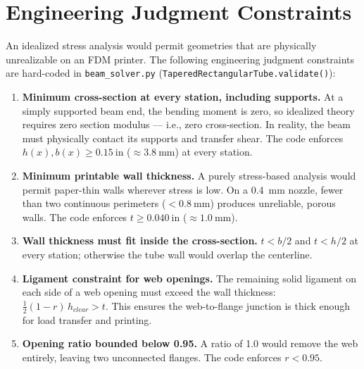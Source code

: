 \documentclass[11pt,letterpaper]{article}
\begin{document}
\section{Engineering Judgment Constraints}
\label{sec:constraints}

An idealized stress analysis would permit geometries that are physically
unrealizable on an FDM printer.  The following engineering judgment constraints
are hard-coded in \texttt{beam\_solver.py} (\texttt{TaperedRectangularTube.validate()}):

\begin{enumerate}
  \item \textbf{Minimum cross-section at every station, including supports.}
    At a simply supported beam end, the bending moment is zero, so idealized
    theory requires zero section modulus --- i.e., zero cross-section.  In
    reality, the beam must physically contact its supports and transfer shear.
    The code enforces $h(x), b(x) \ge 0.15\ \mathrm{in}$ ($\approx 3.8\ \mathrm{mm}$)
    at every station.

  \item \textbf{Minimum printable wall thickness.}
    A purely stress-based analysis would permit paper-thin walls wherever
    stress is low.  On a 0.4~mm nozzle, fewer than two continuous perimeters
    ($< 0.8\ \mathrm{mm}$) produces unreliable, porous walls.  The code
    enforces $t \ge 0.040\ \mathrm{in}$ ($\approx 1.0\ \mathrm{mm}$).

  \item \textbf{Wall thickness must fit inside the cross-section.}
    $t < b/2$ and $t < h/2$ at every station; otherwise the tube wall
    would overlap the centerline.

  \item \textbf{Ligament constraint for web openings.}
    The remaining solid ligament on each side of a web opening must exceed
    the wall thickness: $\tfrac{1}{2}(1 - r)\,h_{clear} > t$.  This ensures
    the web-to-flange junction is thick enough for load transfer and printing.

  \item \textbf{Opening ratio bounded below 0.95.}
    A ratio of 1.0 would remove the web entirely, leaving two unconnected
    flanges.  The code enforces $r < 0.95$.
\end{enumerate}
\end{document}

